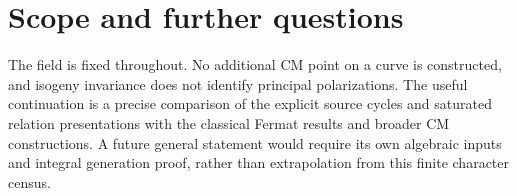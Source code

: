 \section{Scope and further questions}
The field is fixed throughout. No additional CM point on a curve is
constructed, and isogeny invariance does not identify principal
polarizations. The useful continuation is a precise comparison of the
explicit source cycles and saturated relation presentations with the
classical Fermat results and broader CM constructions. A future general
statement would require its own algebraic inputs and integral generation
proof, rather than extrapolation from this finite character census.
